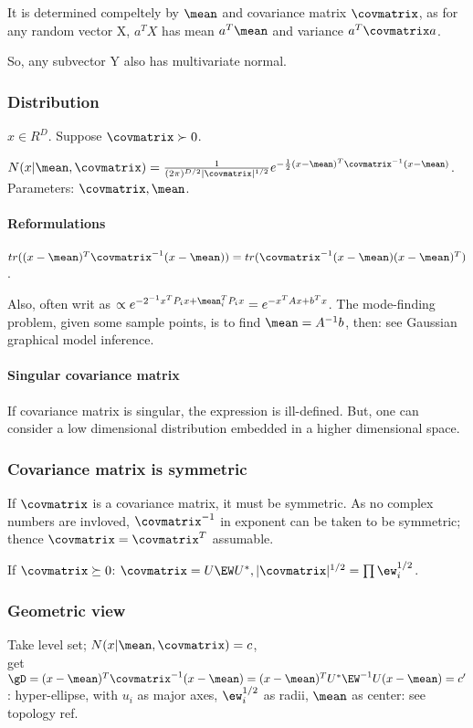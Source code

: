 \documentclass[oneside, article]{memoir}
\begin{document}
It is determined compeltely by $\mean$ and covariance matrix $\covmatrix$, as for any random vector X, $a^{T}X$ has mean $a^{T}\mean$ and variance $a^{T}\covmatrix a$.

So, any subvector Y also has multivariate normal. 

\subsubsection{Distribution}
$x \in R^{D}$. Suppose $\covmatrix \succ 0$.

$N(x|\mean, \covmatrix) = \frac{1}{(2\pi)^{D/2} |\covmatrix|^{1/2}} e^{-\frac{1}{2}(x - \mean)^{T}\covmatrix^{-1}(x-\mean)}$. Parameters: $\covmatrix, \mean$.

\paragraph*{Reformulations}
$tr((x - \mean)^{T}\covmatrix^{-1}(x-\mean)) = tr(\covmatrix^{-1}(x-\mean)(x - \mean)^{T})$.

Also, often writ as $\propto e^{-2^{-1}x^{T}P_ix + \mean_i^{T}P_ix} = e^{-x^{T}Ax + b^{T}x}$. The mode-finding problem, given some sample points, is to find $\mean = A^{-1}b$, then: see Gaussian graphical model inference.

\paragraph*{Singular covariance matrix}
If covariance matrix is singular, the expression is ill-defined. But, one can consider a low dimensional distribution embedded in a higher dimensional space.


\subsubsection{Covariance matrix is symmetric}
If $\covmatrix$ is a covariance matrix, it must be symmetric. As no complex numbers are invloved, $\covmatrix^{-1}$ in exponent can be taken to be symmetric; thence $\covmatrix = \covmatrix^{T}$ assumable.

If $\covmatrix \succeq 0$: $\covmatrix  = U\EW U^{*}, |\covmatrix|^{1/2} = \prod \ew_{i}^{1/2}$.

\subsubsection{Geometric view}
Take level set; $N(x|\mean, \covmatrix) = c$, \\
get $\gD = (x - \mean)^{T}\covmatrix^{-1}(x-\mean) = (x - \mean)^{T}U^{*}\EW^{-1}U(x-\mean) = c'$: hyper-ellipse, with $u_{i}$ as major axes, $\ew_{i}^{1/2}$ as radii, $\mean$ as center: see topology ref.
\end{document}
